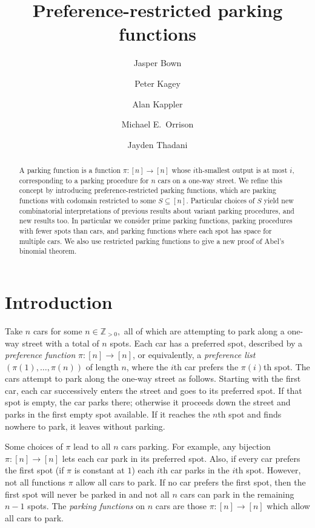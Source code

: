 \documentclass[12 pt]{amsart}
\title{Preference-restricted parking functions}
\author[Bown]{Jasper Bown}
\author[Kagey]{Peter Kagey}
\author[Kappler]{Alan Kappler}
\author[Orrison]{Michael E.~Orrison}
\author[Thadani]{Jayden Thadani}
\theoremstyle{definition} %
\theoremstyle{remark} %
\begin{document}
\begin{abstract}
     A parking function is a function $\pi:[n]\to [n]$ whose $i$th-smallest output is at most $i,$ corresponding to a parking procedure for $n$ cars on a one-way street. We refine this concept by introducing preference-restricted parking functions, which are parking functions with codomain restricted to some $S\subseteq[n]$. Particular choices of $S$ yield new combinatorial interpretations of previous results about variant parking procedures, and new results too. In particular we consider prime parking functions, parking procedures with fewer spots than cars, and parking functions where each spot has space for multiple cars. We also use restricted parking functions to give a new proof of Abel's binomial theorem.
\end{abstract}

\maketitle

\pagebreak

\tableofcontents

\pagebreak

\makeatletter
\providecommand\@dotsep{5}
\makeatother
\listoftodos\relax

\pagebreak

\section{Introduction} \label{sec:intro}

Take $n$ cars for some $n\in\mathbb{Z}_{> 0},$ all of which are attempting to park along a one-way street with a total of $n$ spots. Each car has a preferred spot, described by a \emph{preference function} $\pi:[n]\to[n]$, or equivalently, a \emph{preference list} $(\pi(1), \dots, \pi(n))$ of length $n$, where the $i$th car prefers the $\pi(i)$th spot. The cars attempt to park along the one-way street as follows. Starting with the first car, each car successively enters the street and goes to its preferred spot. If that spot is empty, the car parks there; otherwise it proceeds down the street and parks in the first empty spot available. If it reaches the $n$th spot and finds nowhere to park, it leaves without parking.

Some choices of $\pi$ lead to all $n$ cars parking. For example, any bijection $\pi:[n]\to[n]$ lets each car park in its preferred spot. Also, if every car prefers the first spot (if $\pi$ is constant at $1$) each $i$th car parks in the $i$th spot. However, not all functions $\pi$ allow all cars to park. If no car prefers the first spot, then the first spot will never be parked in and not all $n$ cars can park in the remaining $n-1$ spots. The \emph{parking functions} on $n$ cars are those $\pi : [n] \to [n]$  which allow all cars to park.
\end{document}
